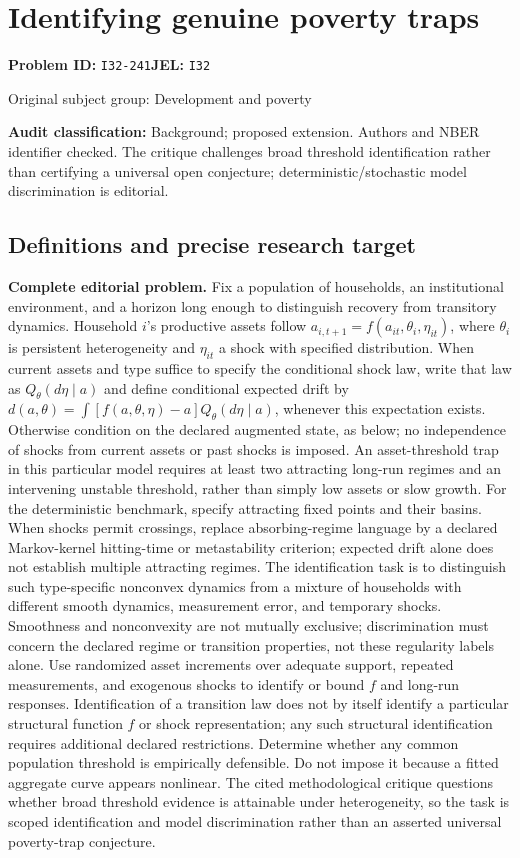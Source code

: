 \documentclass[11pt,a4paper]{article}
\begin{document}
\section*{Identifying genuine poverty traps}
\textbf{Problem ID:} \texttt{I32-241}\quad \textbf{JEL:} \texttt{I32}\par
\label{problem:OP-0370}
{\sffamily\small\color{muted}Original subject group: Development and poverty\par}
\label{definitions:problem:30007652}
\textbf{Audit classification:} Background; proposed extension. Authors and NBER identifier checked. The critique challenges broad threshold identification rather than certifying a universal open conjecture; deterministic/stochastic model discrimination is editorial.
\subsection*{Definitions and precise research target}
\textbf{Complete editorial problem.} Fix a population of households, an institutional environment, and a horizon long enough to distinguish recovery from transitory dynamics. Household \(i\)'s productive assets follow \(a_{i,t+1}=f(a_{it},\theta_i,\eta_{it})\), where \(\theta_i\) is persistent heterogeneity and \(\eta_{it}\) a shock with specified distribution. When current assets and type suffice to specify the conditional shock law, write that law as \(Q_\theta(d\eta\mid a)\) and define conditional expected drift by \(d(a,\theta)=\int[f(a,\theta,\eta)-a]Q_\theta(d\eta\mid a)\), whenever this expectation exists. Otherwise condition on the declared augmented state, as below; no independence of shocks from current assets or past shocks is imposed. An asset-threshold trap in this particular model requires at least two attracting long-run regimes and an intervening unstable threshold, rather than simply low assets or slow growth. For the deterministic benchmark, specify attracting fixed points and their basins. When shocks permit crossings, replace absorbing-regime language by a declared Markov-kernel hitting-time or metastability criterion; expected drift alone does not establish multiple attracting regimes. The identification task is to distinguish such type-specific nonconvex dynamics from a mixture of households with different smooth dynamics, measurement error, and temporary shocks. Smoothness and nonconvexity are not mutually exclusive; discrimination must concern the declared regime or transition properties, not these regularity labels alone. Use randomized asset increments over adequate support, repeated measurements, and exogenous shocks to identify or bound \(f\) and long-run responses. Identification of a transition law does not by itself identify a particular structural function \(f\) or shock representation; any such structural identification requires additional declared restrictions. Determine whether any common population threshold is empirically defensible. Do not impose it because a fitted aggregate curve appears nonlinear. The cited methodological critique questions whether broad threshold evidence is attainable under heterogeneity, so the task is scoped identification and model discrimination rather than an asserted universal poverty-trap conjecture.
\end{document}
